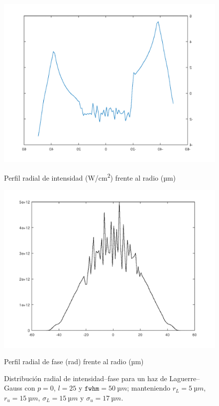 \begin{figure}[htbp]
  \centering
  \begin{subcaptionblock}{.4\textwidth}
    \centering
    \includegraphics[width=\textwidth]{Figuras/anx_oamfs_7.png}
    \caption*{Perfil radial de intensidad (\unit{W/cm^2}) frente al radio (\unit{µm})}
  \end{subcaptionblock}
  \begin{subcaptionblock}{.4\textwidth}
    \centering
    \includegraphics[width=\textwidth]{Figuras/anx_oamint_7.png}
    \caption*{Perfil radial de fase (\unit{rad}) frente al radio (\unit{µm})}
  \end{subcaptionblock}
   \caption*{Distribución radial de intensidad--fase para un haz de Laguerre--Gauss con $p=0$, $l=25$ y $\texttt{fwhm}=\qty{50}{µm}$; manteniendo $r_{L}=\qty{5}{µm}$, $r_{u}=\qty{15}{µm}$, $\sigma_{L}=\qty{15}{µm}$ y $\sigma_{u}=\qty{17}{µm}$.}
\end{figure}

